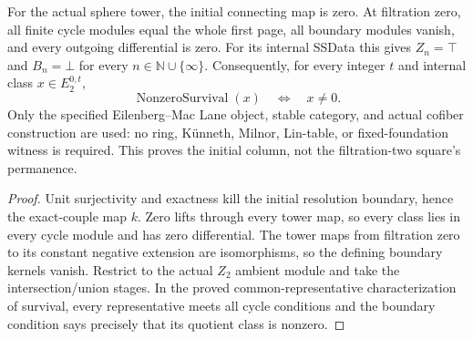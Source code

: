 \begin{proposition}
  \label{prop:h6-sphere-initial-survival}
  \leanok
  For the actual sphere tower, the initial connecting map is zero.
  At filtration zero, all finite cycle modules equal the whole first
  page, all boundary modules vanish, and every outgoing differential
  is zero. For its internal SSData this gives $Z_n=\top$ and $B_n=\bot$
  for every $n\in\mathbb N\cup\{\infty\}$. Consequently, for every
  integer $t$ and internal class $x\in E_2^{0,t}$,
  \[
    \operatorname{NonzeroSurvival}(x)\quad\Longleftrightarrow\quad x\ne0.
  \]
  Only the specified Eilenberg--Mac Lane object, stable category, and
  actual cofiber construction are used: no ring, K\"unneth, Milnor,
  Lin-table, or fixed-foundation witness is required. This proves the
  initial column, not the filtration-two square's permanence.
\end{proposition}
\begin{proof}
  Unit surjectivity and exactness kill the initial resolution boundary,
  hence the exact-couple map $k$. Zero lifts through every tower map, so
  every class lies in every cycle module and has zero differential.
  The tower maps from filtration zero to its constant negative extension
  are isomorphisms, so the defining boundary kernels vanish. Restrict to
  the actual $Z_2$ ambient module and take the intersection/union stages.
  In the proved common-representative characterization of survival,
  every representative meets all cycle conditions and the boundary
  condition says precisely that its quotient class is nonzero.
  \leanok
\end{proof}

